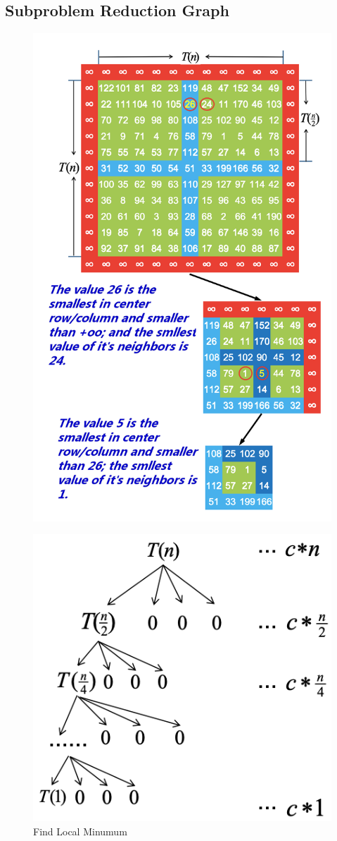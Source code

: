 \documentclass[UTF8,a4paper,12pt]{article}
\begin{document}
	\newpage
	\subsection{Subproblem Reduction Graph}
	\newpage
	\begin{figure}[htb]
		\centering
		\includegraphics[width=.7\textwidth]{./pictures/alg1/problem4-1.png}
	\end{figure}
	
	\begin{figure}[htb]
		\centering
		\includegraphics[scale=.6]{./pictures/alg1/problem4-2.png}
		\caption{Find Local Minumum}
	\end{figure}
\end{document}
